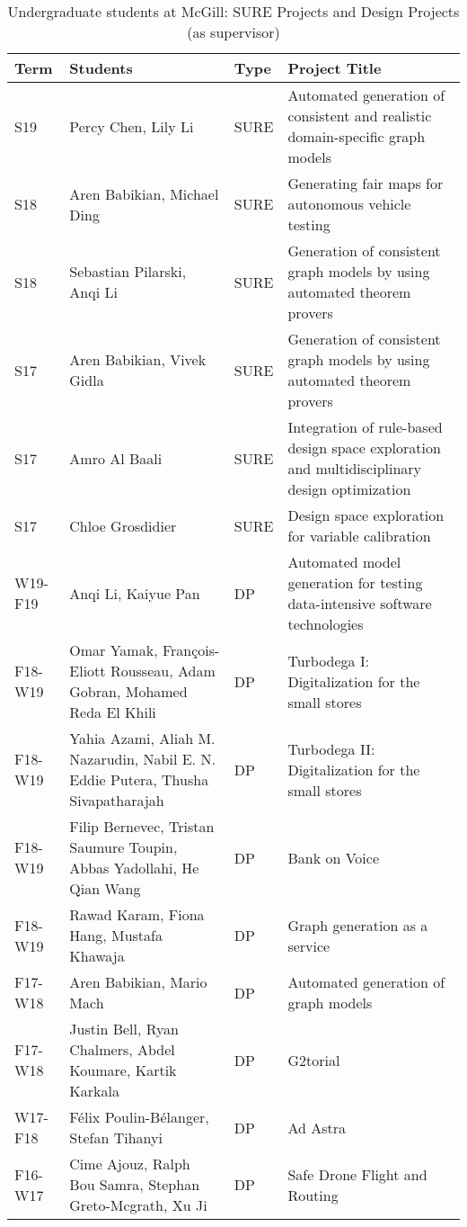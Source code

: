 \begin{table}[htbp]
\footnotesize
\begin{tabular}{@{}lp{6.5cm}lp{6.5cm}@{}}
\toprule
\textbf{Term} & \textbf{Students} & \textbf{Type} & \textbf{Project Title} \\ \midrule
S19 & Percy Chen, Lily Li & SURE& Automated generation of consistent and realistic domain-specific graph models\\
S18 & Aren Babikian, Michael Ding & SURE & Generating fair maps for autonomous vehicle testing\\
S18 & Sebastian Pilarski, Anqi Li& SURE & Generation of consistent graph models by using automated theorem provers\\
S17 & Aren Babikian, Vivek Gidla & SURE & Generation of consistent graph models by using automated theorem provers\\
S17 & Amro Al Baali & SURE & Integration of rule-based design space exploration and multidisciplinary design optimization\\
S17 & Chloe Grosdidier & SURE & Design space exploration for variable calibration\\ \midrule
W19-F19 & Anqi Li, Kaiyue Pan & DP  & Automated model generation for testing data-intensive software technologies \\
F18-W19 & Omar Yamak, François-Eliott Rousseau, Adam Gobran, Mohamed Reda El Khili & DP  & Turbodega I: Digitalization for the small stores\\
F18-W19 & Yahia Azami, Aliah M. Nazarudin, Nabil E. N. Eddie Putera, Thusha Sivapatharajah & DP  & Turbodega II: Digitalization for the small stores\\
F18-W19 & Filip Bernevec, Tristan Saumure Toupin, Abbas Yadollahi, He Qian Wang & DP  & Bank on Voice \\
F18-W19 & Rawad Karam, Fiona Hang, Mustafa Khawaja& DP  & Graph generation as a service\\
F17-W18 & Aren Babikian, Mario Mach & DP  & Automated generation of graph models\\
F17-W18 & Justin Bell, Ryan Chalmers, Abdel Koumare, Kartik Karkala & DP & G2torial\\
W17-F18 & F\'elix Poulin-B\'elanger, Stefan Tihanyi & DP  & Ad Astra\\
F16-W17 & Cime Ajouz, Ralph Bou Samra, Stephan Greto-Mcgrath, Xu Ji & DP  & Safe Drone Flight and Routing\\
\midrule
\bottomrule
\end{tabular}
\caption{Undergraduate students at McGill: SURE Projects and Design Projects (as supervisor)}
\label{tab:ug-supervised}
\end{table}
